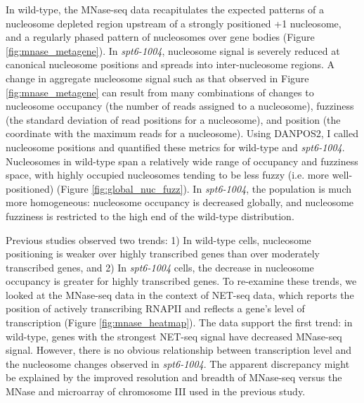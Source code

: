 \documentclass[10pt, letterpaper]{article}
\begin{document}
In wild-type, the MNase-seq data recapitulates the expected patterns of a nucleosome depleted region upstream of a strongly positioned +1 nucleosome, and a regularly phased pattern of nucleosomes over gene bodies (Figure \ref{fig:mnase_metagene}). In \textit{spt6-1004}, nucleosome signal is severely reduced at canonical nucleosome positions and spreads into inter-nucleosome regions. A change in aggregate nucleosome signal such as that observed in Figure \ref{fig:mnase_metagene} can result from many combinations of changes to nucleosome occupancy (the number of reads assigned to a nucleosome), fuzziness (the standard deviation of read positions for a nucleosome), and position (the coordinate with the maximum reads for a nucleosome). Using DANPOS2, I called nucleosome positions and quantified these metrics for wild-type and \textit{spt6-1004}. Nucleosomes in wild-type span a relatively wide range of occupancy and fuzziness space, with highly occupied nucleosomes tending to be less fuzzy (i.e. more well-positioned) (Figure \ref{fig:global_nuc_fuzz}). In \textit{spt6-1004}, the population is much more homogeneous: nucleosome occupancy is decreased globally, and nucleosome fuzziness is restricted to the high end of the wild-type distribution.

Previous studies observed two trends: 1) In wild-type cells, nucleosome positioning is weaker over highly transcribed genes than over moderately transcribed genes, and 2) In \textit{spt6-1004} cells, the decrease in nucleosome occupancy is greater for highly transcribed genes. To re-examine these trends, we looked at the MNase-seq data in the context of NET-seq data, which reports the position of actively transcribing RNAPII and reflects a gene's level of transcription (Figure \ref{fig:mnase_heatmap}). The data support the first trend: in wild-type, genes with the strongest NET-seq signal have decreased MNase-seq signal. However, there is no obvious relationship between transcription level and the nucleosome changes observed in \textit{spt6-1004}. The apparent discrepancy might be explained by the improved resolution and breadth of MNase-seq versus the MNase and microarray of chromosome III used in the previous study.
\end{document}
